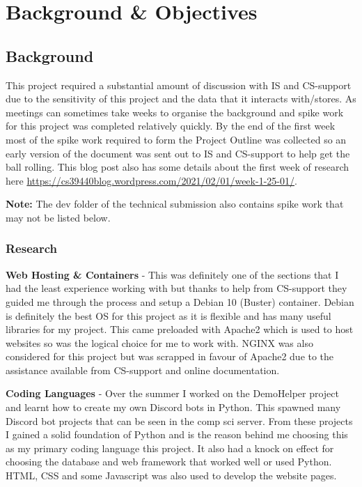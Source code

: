 \chapter{Background \& Objectives} 

\section{Background}

This project required a substantial amount of discussion with IS and CS-support due to the sensitivity of this project and the data that it interacts with/stores. As meetings can sometimes take weeks to organise the background and spike work for this project was completed relatively quickly. By the end of the first week most of the spike work required to form the Project Outline was collected so an early version of the document was sent out to IS and CS-support to help get the ball rolling. This blog post also has some details about the first week of research here \href{https://cs39440blog.wordpress.com/2021/02/01/week-1-25-01/}{https://cs39440blog.wordpress.com/2021/02/01/week-1-25-01/}.

\textbf{Note:} The dev folder of the technical submission also contains spike work that may not be listed below.

\subsection{Research}\label{sec1:Research}
\textbf{Web Hosting \& Containers} - This was definitely one of the sections that I had the least experience working with but thanks to help from CS-support they guided me through the process and setup a Debian 10 (Buster) \cite{debian} container. Debian is definitely the best OS for this project as it is flexible and has many useful libraries for my project. This came preloaded with Apache2 \cite{apache2} which is used to host websites so was the logical choice for me to work with. NGINX \cite{nginx} was also considered for this project but was scrapped in favour of Apache2 due to the assistance available from CS-support and online documentation. 

\textbf{Coding Languages} -  Over the summer I worked on the DemoHelper \cite{demohelper} project and learnt how to create my own Discord bots in Python. This spawned many Discord bot projects that can be seen in the comp sci server. From these projects I gained a solid foundation of Python and is the reason behind me choosing this as my primary coding language this project. It also had a knock on effect for choosing the database and web framework that worked well or used Python. HTML, CSS and some Javascript was also used to develop the website pages.

